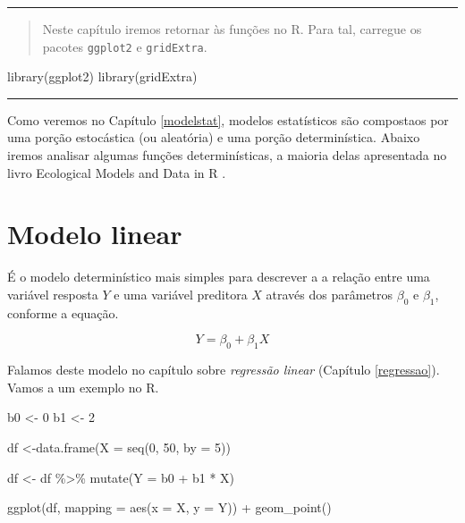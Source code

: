 \documentclass[
]{book}
\newenvironment{Shaded}{\begin{snugshade}}{\end{snugshade}}
\newcommand{\AttributeTok}[1]{\textcolor[rgb]{0.77,0.63,0.00}{#1}}
\newcommand{\DecValTok}[1]{\textcolor[rgb]{0.00,0.00,0.81}{#1}}
\newcommand{\FunctionTok}[1]{\textcolor[rgb]{0.00,0.00,0.00}{#1}}
\newcommand{\NormalTok}[1]{#1}
\newcommand{\OtherTok}[1]{\textcolor[rgb]{0.56,0.35,0.01}{#1}}
\newcommand{\SpecialCharTok}[1]{\textcolor[rgb]{0.00,0.00,0.00}{#1}}
\begin{document}
\begin{center}\rule{0.5\linewidth}{0.5pt}\end{center}

\begin{quote}
Neste capítulo iremos retornar às funções no R. Para tal, carregue os pacotes \texttt{ggplot2} e \texttt{gridExtra}.
\end{quote}

\begin{Shaded}
\begin{Highlighting}[]
\FunctionTok{library}\NormalTok{(ggplot2)}
\FunctionTok{library}\NormalTok{(gridExtra)}
\end{Highlighting}
\end{Shaded}

\begin{center}\rule{0.5\linewidth}{0.5pt}\end{center}

Como veremos no Capítulo \ref{modelstat}, modelos estatísticos são compostaos por uma porção estocástica (ou aleatória) e uma porção determinística. Abaixo iremos analisar algumas funções determinísticas, a maioria delas apresentada no livro Ecological Models and Data in R \citep{bolker2008ecological}.

\hypertarget{modelo-linear}{%
\section{Modelo linear}\label{modelo-linear}}

É o modelo determinístico mais simples para descrever a a relação entre uma variável resposta \(Y\) e uma variável preditora \(X\) através dos parâmetros \(\beta_0\) e \(\beta_1\), conforme a equação.

\[Y = \beta_0 + \beta_1X\]

Falamos deste modelo no capítulo sobre \emph{regressão linear} (Capítulo \ref{regressao}).
Vamos a um exemplo no R.

\begin{Shaded}
\begin{Highlighting}[]
\NormalTok{b0 }\OtherTok{\textless{}{-}} \DecValTok{0}
\NormalTok{b1 }\OtherTok{\textless{}{-}} \DecValTok{2}

\NormalTok{df }\OtherTok{\textless{}{-}}\FunctionTok{data.frame}\NormalTok{(}\AttributeTok{X =} \FunctionTok{seq}\NormalTok{(}\DecValTok{0}\NormalTok{, }\DecValTok{50}\NormalTok{, }\AttributeTok{by =} \DecValTok{5}\NormalTok{))}

\NormalTok{df }\OtherTok{\textless{}{-}}\NormalTok{ df }\SpecialCharTok{\%\textgreater{}\%} \FunctionTok{mutate}\NormalTok{(}\AttributeTok{Y =}\NormalTok{ b0 }\SpecialCharTok{+}\NormalTok{ b1 }\SpecialCharTok{*}\NormalTok{ X)}

\FunctionTok{ggplot}\NormalTok{(df, }\AttributeTok{mapping =} \FunctionTok{aes}\NormalTok{(}\AttributeTok{x =}\NormalTok{ X, }\AttributeTok{y =}\NormalTok{ Y)) }\SpecialCharTok{+}
  \FunctionTok{geom\_point}\NormalTok{()}
\end{Highlighting}
\end{Shaded}
\end{document}
